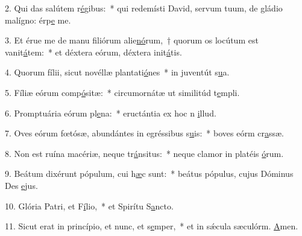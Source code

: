 2. Qui das salútem r\uline{é}gibus:~* qui redemísti David, servum tuum, de gládio malígno: érp\uline{e} me.\par 
3. Et érue me de manu filiórum alie\uline{nó}rum,~† quorum os locútum est vanit\uline{á}tem:~* et déxtera eórum, déxtera init\uline{á}tis.\par 
4. Quorum fílii, sicut novéllæ plantati\uline{ó}nes~* in juventút s\uline{u}a.\par 
5. Fíliæ eórum comp\uline{ó}sitæ:~* circumornátæ ut similitúd t\uline{e}mpli.\par 
6. Promptuária eórum pl\uline{e}na:~* eructántia ex hoc n \uline{i}llud.\par 
7. Oves eórum fœtósæ, abundántes in egréssibus s\uline{u}is:~* boves eórm cr\uline{a}ssæ.\par 
8. Non est ruína macériæ, neque tr\uline{á}nsitus:~* neque clamor in platéis \uline{ó}rum.\par 
9. Beátum dixérunt pópulum, cui h\uline{æ}c sunt:~* beátus pópulus, cujus Dóminus Des \uline{e}jus.\par 
10. Glória Patri, et F\uline{í}lio,~* et Spirítu S\uline{a}ncto.\par 
11. Sicut erat in princípio, et nunc, et s\uline{e}mper,~* et in sǽcula sæculórm. \uline{A}men.\par 
